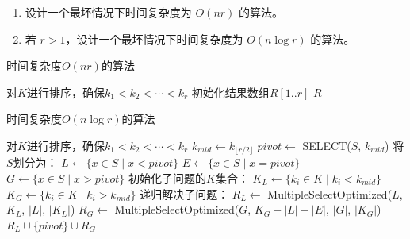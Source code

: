 \documentclass[./../main.tex]{subfiles}
\begin{document}
\begin{enumerate}
    \item 设计一个最坏情况下时间复杂度为 $O(nr)$ 的算法。
    \item 若 $r>1$，设计一个最坏情况下时间复杂度为 $O(n \log r)$ 的算法。
\end{enumerate}

时间复杂度$O(nr)$的算法
\begin{algorithm}[h]
    \BlankLine
    对$K$进行排序，确保$k_1 < k_2 < \cdots < k_r$\;
    初始化结果数组$R[1..r]$\;
    \Return $R$\;
    \caption{MultipleSelectBasic}
\end{algorithm}

时间复杂度$O(n\log r)$的算法
\begin{algorithm}[t]
    \BlankLine
    对$K$进行排序，确保$k_1 < k_2 < \cdots < k_r$\;
    $k_{mid} \gets k_{\lfloor r/2 \rfloor}$\;
    $pivot \gets$ SELECT($S$, $k_{mid}$)\;
    将$S$划分为：
    $L \gets \{x \in S \mid x < pivot\}$\;
    $E \gets \{x \in S \mid x = pivot\}$\;
    $G \gets \{x \in S \mid x > pivot\}$\;
    初始化子问题的$K$集合：
    $K_L \gets \{k_i \in K \mid k_i < k_{mid}\}$\;
    $K_G \gets \{k_i \in K \mid k_i > k_{mid}\}$\;
    递归解决子问题：
    $R_L \gets$ MultipleSelectOptimized($L$, $K_L$, $|L|$, $|K_L|$)\;
    $R_G \gets$ MultipleSelectOptimized($G$, $K_G - |L| - |E|$, $|G|$, $|K_G|$)\;
    \Return $R_L \cup \{pivot\} \cup R_G$\;
    \caption{MultipleSelectOptimized}
\end{algorithm}
\end{document}
